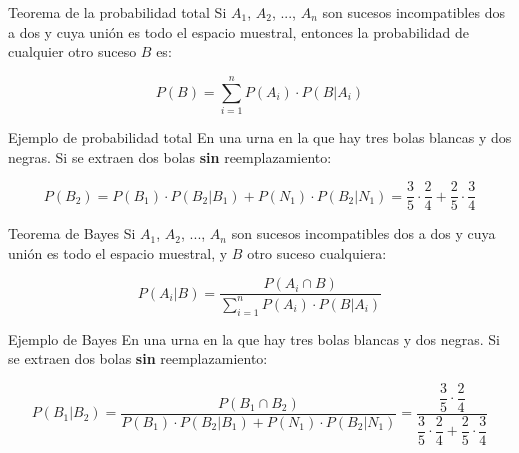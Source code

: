 \documentclass[11pt,handout]{beamer}
\begin{document}
\begin{frame}{Teorema de la probabilidad total}
Si $A_1$, $A_2$, ..., $A_n$   son sucesos incompatibles dos a dos y cuya unión es todo el espacio muestral, entonces la probabilidad de cualquier otro suceso $B$ es:

$$P(B)=\sum_{i=1}^n P(A_i)\cdot  P(B|A_i) $$
\end{frame}

\begin{frame}{Ejemplo de probabilidad total}
En una urna en la que hay tres bolas blancas y dos negras. Si se extraen dos bolas \textbf{sin} reemplazamiento:


$$P(B_2)=P(B_1)\cdot P(B_2|B_1) + P(N_1)\cdot P(B_2|N_1)
= \frac{3}{5}\cdot\frac{2}{4} + \frac{2}{5}\cdot\frac{3}{4}$$
\end{frame}


\begin{frame}{Teorema de Bayes}
Si $A_1$, $A_2$, ..., $A_n$   son sucesos incompatibles dos a dos y cuya unión es todo el espacio muestral, y $B$ otro suceso cualquiera:

$$P(A_i|B)=\dfrac{P(A_i \cap B)}{\sum_{i=1}^n P(A_i)\cdot  P(B|A_i)} $$

\end{frame}

\begin{frame}{Ejemplo de Bayes}
En una urna en la que hay tres bolas blancas y dos negras. Si se extraen dos bolas \textbf{sin} reemplazamiento:


$$P(B_1|B_2)=\dfrac{P(B_1 \cap B_2)}{P(B_1)\cdot  P(B_2|B_1)+P(N_1)\cdot  P(B_2|N_1)}=\dfrac{\dfrac{3}{5}\cdot\dfrac{2}{4}}{\dfrac{3}{5}\cdot\dfrac{2}{4} + \dfrac{2}{5}\cdot\dfrac{3}{4}}$$
\end{frame}
\end{document}
